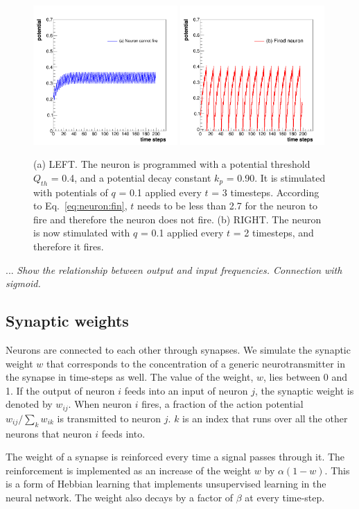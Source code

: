 \begin{figure}[thp]
\centering
\includegraphics[width=0.49\textwidth]{c_potential_time_sawtooth_a.png}
\includegraphics[width=0.49\textwidth]{c_potential_time_sawtooth_b.png}
\caption{(a) LEFT. The neuron is programmed with a potential threshold $Q_{th}$ = 0.4, and a potential decay constant $k_p$ = 0.90. It is stimulated with potentials of $q$ = 0.1 applied every $t$ = 3 timesteps. According to Eq.~\ref{eq:neuron:fin}, $t$ needs to be less than 2.7 for the neuron to fire and therefore the neuron does not fire. (b) RIGHT. The neuron is now stimulated with $q$ = 0.1 applied every $t$ = 2 timesteps, and therefore it fires.}
\label{fig:c_potential_time_sawtooth}
\end{figure}

... \textit{Show the relationship between output and input frequencies. Connection with sigmoid.}

\subsection{Synaptic weights}

Neurons are connected to each other through synapses. We simulate the synaptic weight $w$ that corresponds to the concentration of a generic neurotransmitter in the synapse in time-steps as well. The value of the weight, $w$, lies between 0 and 1. If the output of neuron $i$ feeds into an input of neuron $j$, the synaptic weight is denoted by $w_{ij}$. When neuron $i$ fires, a fraction of the action potential $w_{ij}/\sum_{k}w_{ik}$ is transmitted to neuron $j$. $k$ is an index that runs over all the other neurons that neuron $i$ feeds into.

The weight of a synapse is reinforced every time a signal passes through it. The reinforcement is implemented as an increase of the weight $w$ by $\alpha(1-w)$. This is a form of Hebbian learning that implements unsupervised learning in the neural network. The weight also decays by a factor of $\beta$ at every time-step.


